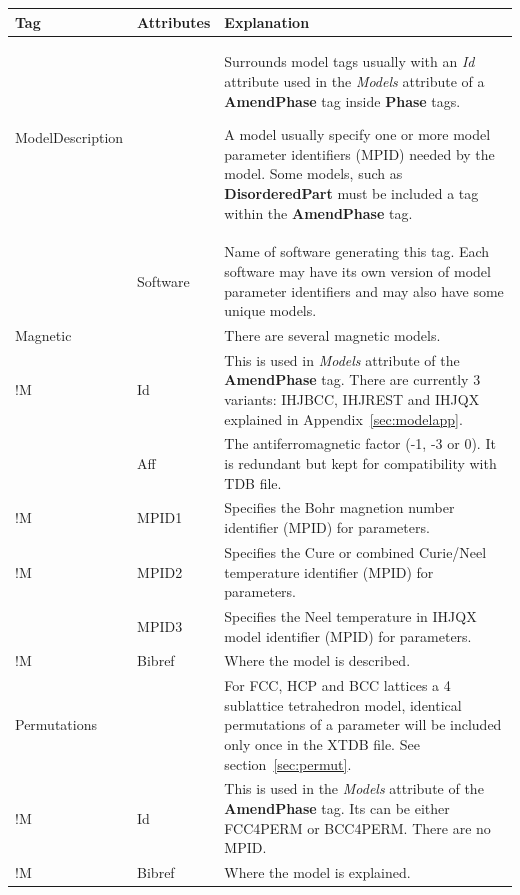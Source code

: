 \documentclass{article}
\begin{document}
\bigskip
\begin{tabular}{|p{} p{} p{}|}\hline
  Tag & Attributes & Explanation\\\hline

  ModelDescription & & Surrounds model tags usually with an {\em Id} attribute
             used in the {\em Models} attribute of a {\bf AmendPhase} tag
             inside {\bf Phase} tags.  

             A model usually specify one or more model parameter 
             identifiers (MPID) needed by the model.  Some models, 
             such as {\bf DisorderedPart}  must be included a tag 
             within the {\bf AmendPhase} tag.\\

    & Software & Name of software generating this tag.  Each software
                may have its own version of model parameter identifiers
                and may also have some unique models.  \\\hline

  Magnetic &  &  There are several magnetic models.\\
!M     & Id   &  This is used in {\em Models} attribute of the 
                 {\bf AmendPhase} tag.  There are currently 3 variants:
                 IHJBCC, IHJREST and IHJQX explained 
                 in Appendix~\ref{sec:modelapp}. \\
       & Aff    & The antiferromagnetic factor (-1, -3 or 0).  It is
                 redundant but kept for compatibility with TDB file.\\
!M     & MPID1 & Specifies the Bohr magnetion number 
                 identifier (MPID) for parameters.\\
!M     & MPID2 & Specifies the Cure or combined Curie/Neel temperature 
                 identifier (MPID) for parameters.\\
       & MPID3 & Specifies the Neel temperature in IHJQX model 
                 identifier (MPID) for parameters.\\
!M     & Bibref & Where the model is described.\\\hline

 Permutations & & For FCC, HCP and BCC lattices a 4 sublattice tetrahedron
                 model, identical permutations of a parameter will be included 
                 only once in the XTDB file.  See section~\ref{sec:permut}.\\
!M     & Id & This is used in the {\em Models} attribute of the
                {\bf AmendPhase} tag.  Its can be either FCC4PERM or BCC4PERM.
                There are no MPID. \\
!M     & Bibref & Where the model is explained.\\\hline


\end{tabular}
\end{document}
